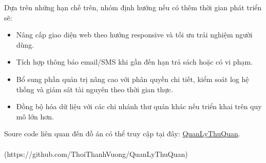 \documentclass{article}
\begin{document}
\noindent Dựa trên những hạn chế trên, nhóm định hướng nếu có thêm thời gian phát triển sẽ:
\begin{itemize}
    \item Nâng cấp giao diện web theo hướng responsive và tối ưu trải nghiệm người dùng.
    \item Tích hợp thông báo email/SMS khi gần đến hạn trả sách hoặc có vi phạm.
    \item Bổ sung phần quản trị nâng cao với phân quyền chi tiết, kiểm soát log hệ thống và giám sát tài nguyên theo thời gian thực.
    \item Đồng bộ hóa dữ liệu với các chi nhánh thư quán khác nếu triển khai trên quy mô lớn hơn.
\end{itemize}

\noindent Soure code liên quan đến đồ án có thể truy cập tại đây:
\href{https://github.com/ThoiThanhVuong/QuanLyThuQuan}{QuanLyThuQuan}.\\ \\
(https://github.com/ThoiThanhVuong/QuanLyThuQuan)
\end{document}
